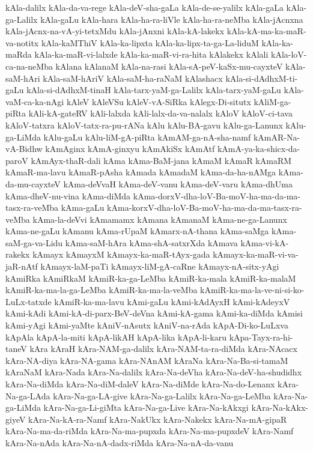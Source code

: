 {kAla-dalilx
kAla-da-va-rege
kAla-deV-sha-gaLa
kAla-de-se-yalilx
kAla-gaLa
kAla-ga-Lalilx
kAla-gaLu
kAla-hara
kAla-ha-ra-liVle
kAla-ha-ra-neMba
kAla-jAcnxna
kAla-jAcnx-na-vA-yi-tetxMdu
kAla-jAnxni
kAla-kA-lakekx
kAla-kA-ma-ka-maR-va-notitx
kAla-kaMThiV
kAla-ka-lipxta
kAla-ka-lipx-ta-ga-La-liduM
kAla-ka-maRda
kAla-ka-maR-vi-lalxde
kAla-ka-maR-vi-ra-hita
kAlakekx
kAlali
kAla-loV-ca-na-neMba
kAlana
kAlanaM
kAla-na-rasi
kAla-sA-peV-kaSx-mu-cayxteV
kAla-saM-hAri
kAla-saM-hAriV
kAla-saM-ha-raNaM
kAlashacx
kAla-si-dAdhxM-ti-gaLu
kAla-si-dAdhxM-tinaH
kAla-tarx-yaM-ga-Lalilx
kAla-tarx-yaM-gaLu
kAla-vaM-ca-ka-nAgi
kAleV
kAleVSu
kAleV-vA-SiRka
kAlegx-Di-situtx
kAliM-ga-piRta
kAli-kA-gateRV
kAli-lalxda
kAli-lalx-da-va-nalalx
kAloV
kAloV-ci-tava
kAloV-tatxra
kAloV-tatx-ra-pu-rANa
kAlu
kAlu-BA-gavu
kAlu-ga-Lanunx
kAlu-ga-LiMda
kAlu-gaLu
kAlu-liM-gA-piRta
kAmAM-ga-nA-sha-namf
kAmAR-Na-vA-Bidhw
kAmAginx
kAmA-ginxyu
kAmAkiSx
kAmAtf
kAmA-ya-ka-shicx-da-paroV
kAmAyx-thaR-dali
kAma
kAma-BaM-jana
kAmaM
kAmaR
kAmaRM
kAmaR-ma-lavu
kAmaR-pAsha
kAmada
kAmadaM
kAma-da-ha-nAMga
kAma-da-mu-cayxteV
kAma-deVvaH
kAma-deV-vanu
kAma-deV-varu
kAma-dhUma
kAma-dheV-nu-vina
kAma-diMda
kAma-dorxV-dha-loV-Ba-moV-ha-ma-da-ma-tasx-ra-veMba
kAma-gaLu
kAma-korxV-dha-loV-Ba-moV-ha-ma-da-ma-tasx-ra-veMba
kAma-la-deVvi
kAmamamx
kAmana
kAmanaM
kAma-ne-ga-Lanunx
kAma-ne-gaLu
kAmanu
kAma-rUpaM
kAmarx-nA-thana
kAma-saMga
kAma-saM-ga-va-Lidu
kAma-saM-hAra
kAma-shA-satxrXda
kAmava
kAma-vi-kA-rakekx
kAmayx
kAmayxM
kAmayx-ka-maR-tAyx-gada
kAmayx-ka-maR-vi-va-jaR-nAtf
kAmayx-laM-paTi
kAmayx-liM-gA-caRne
kAmayx-nA-sitx-yAgi
kAmiRka
kAmiRkaM
kAmiR-ka-ga-LeMba
kAmiR-ka-mala
kAmiR-ka-malaM
kAmiR-ka-ma-la-ga-LeMba
kAmiR-ka-ma-la-veMba
kAmiR-ka-ma-la-ve-ni-si-ko-LuLx-tatxde
kAmiR-ka-ma-lavu
kAmi-gaLu
kAmi-kAdAyxH
kAmi-kAdeyxV
kAmi-kAdi
kAmi-kA-di-parx-BeV-deVna
kAmi-kA-gama
kAmi-ka-diMda
kAmisi
kAmi-yAgi
kAmi-yaMte
kAniV-nAsutx
kAniV-na-rAda
kApA-Di-ko-LuLxva
kApAla
kApA-la-miti
kApA-likAH
kApA-lika
kApA-li-karu
kApa-Tayx-ra-hi-taneV
kAra
kAraH
kAra-NAM-ga-dalilx
kAra-NAM-ta-ra-diMda
kAra-NAcacx
kAra-NA-diya
kAra-NA-gama
kAra-NAnAM
kAraNa
kAra-Na-Ba-si-tamaM
kAraNaM
kAra-Nada
kAra-Na-dalilx
kAra-Na-deVha
kAra-Na-deV-ha-shudidhx
kAra-Na-diMda
kAra-Na-diM-daleV
kAra-Na-diMde
kAra-Na-do-Lenanx
kAra-Na-ga-LAda
kAra-Na-ga-LA-give
kAra-Na-ga-Lalilx
kAra-Na-ga-LeMba
kAra-Na-ga-LiMda
kAra-Na-ga-Li-giMta
kAra-Na-ga-Live
kAra-Na-kAkxgi
kAra-Na-kAkx-giyeV
kAra-Na-kA-ra-Namf
kAra-NakUkx
kAra-Nakekx
kAra-Na-mA-gipaR
kAra-Na-ma-da-riMda
kAra-Na-ma-pupxda
kAra-Na-ma-pupxdeV
kAra-Namf
kAra-Na-nAda
kAra-Na-nA-dadx-riMda
kAra-Na-nA-da-vanu
}

